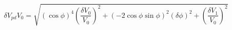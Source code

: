 \begin{equation}
\label{eq:delta_V_Malus}
\delta V_{pd}{V_0} = \sqrt{ {\left(\cos{\phi}\right)}^4\left(\frac{\delta V_0}{V_0}\right)^2 + \left(-2 \cos{\phi}\sin{\phi} \right)^2(\delta \phi)^2+ \left(\frac{\delta V_1}{V_0}\right)^2}
\end{equation}